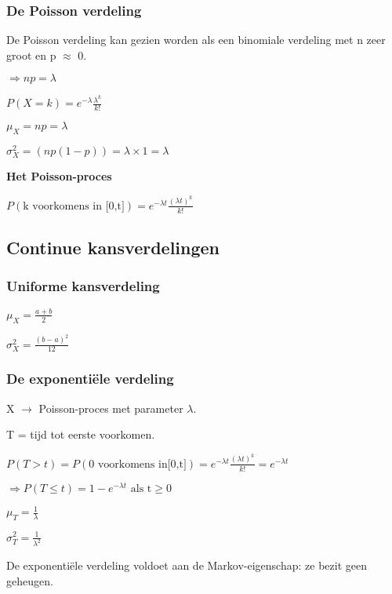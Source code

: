\documentclass[a4paper,12pt]{article}
\begin{document}
\subsubsection{De Poisson verdeling}
De Poisson verdeling kan gezien worden als een binomiale verdeling met n  zeer groot en p $\approx$ 0.

$\Rightarrow np=\lambda$

$P(X=k)=e^{-\lambda}\frac{\lambda^k}{k!}$

$\mu_X = np=\lambda$

$\sigma^2_X=(np(1-p))=\lambda\times 1=\lambda$

\textbf{Het Poisson-proces}

$P(\text{k voorkomens in [0,t]})=e^{-\lambda t}\frac{(\lambda t)^k}{k!}$

\subsection{Continue kansverdelingen}
\subsubsection{Uniforme kansverdeling}
$\mu_X=\frac{a+b}{2}$

$\sigma^2_X=\frac{(b-a)^2}{12}$

\subsubsection{De exponentiële verdeling}
X $\rightarrow$ Poisson-proces met parameter $\lambda$.

T = tijd tot eerste voorkomen.

$P(T>t)=P(\text{0 voorkomens in[0,t]}) = e^{-\lambda t}\frac{(\lambda t)^k}{k!}=e^{-\lambda t}$

$\Rightarrow P(T\leq t) = 1-e^{-\lambda t}\text{ als t} \geq 0$

$\mu_T = \frac{1}{\lambda}$

$\sigma^2_T = \frac{1}{\lambda^2}$

De exponentiële verdeling voldoet aan de Markov-eigenschap: ze bezit geen geheugen.
\end{document}

